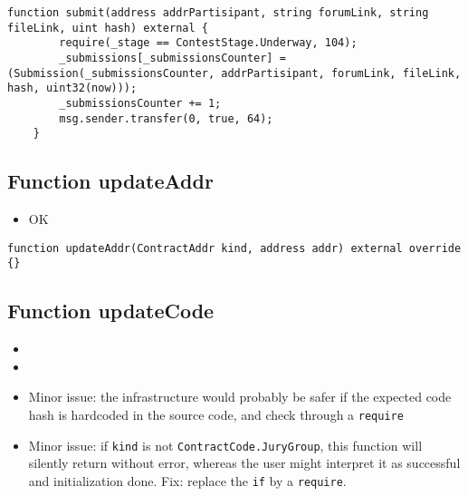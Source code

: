 \begin{lstlisting}[firstnumber=121]
    function submit(address addrPartisipant, string forumLink, string fileLink, uint hash) external {
        require(_stage == ContestStage.Underway, 104);
        _submissions[_submissionsCounter] = (Submission(_submissionsCounter, addrPartisipant, forumLink, fileLink, hash, uint32(now)));
        _submissionsCounter += 1;
        msg.sender.transfer(0, true, 64);
    }
\end{lstlisting}

\subsection{Function updateAddr}

\begin{itemize}
\item OK
\end{itemize}

\begin{lstlisting}[firstnumber=81]
    function updateAddr(ContractAddr kind, address addr) external override {}
\end{lstlisting}

\subsection{Function updateCode}

\begin{itemize}
\item {}
\item {}
\item Minor issue: the infrastructure would probably be safer if the
  expected code hash is hardcoded in the source code, and check
  through a {\tt require}
\item Minor issue: if {\tt kind} is not {\tt ContractCode.JuryGroup},
  this function will silently return without error, whereas the user
  might interpret it as successful and initialization done. Fix:
  replace the {\tt if} by a {\tt require}.
\end{itemize}

